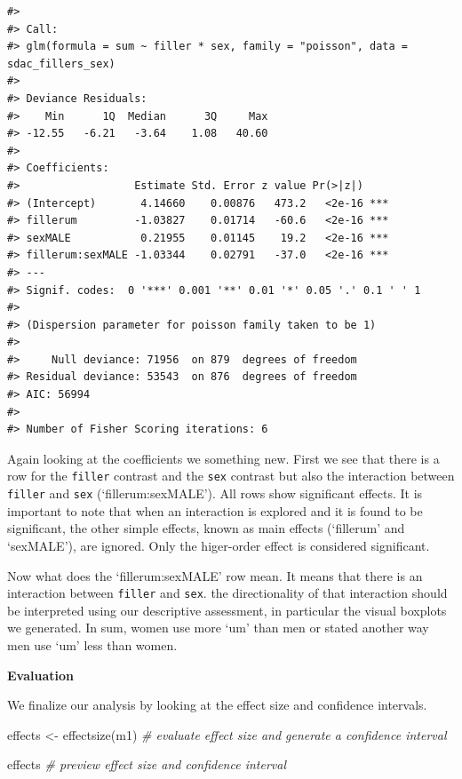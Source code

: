 \documentclass[
  letterpaper,
]{scrbook}
\newenvironment{Shaded}{\begin{snugshade}}{\end{snugshade}}
\newcommand{\CommentTok}[1]{\textcolor[rgb]{0.00,0.00,0.00}{\textit{#1}}}
\newcommand{\FunctionTok}[1]{\textcolor[rgb]{0.00,0.00,0.00}{#1}}
\newcommand{\NormalTok}[1]{\textcolor[rgb]{0.00,0.00,0.00}{#1}}
\newcommand{\OtherTok}[1]{\textcolor[rgb]{0.00,0.00,0.00}{#1}}
\begin{document}
\begin{verbatim}
#> 
#> Call:
#> glm(formula = sum ~ filler * sex, family = "poisson", data = sdac_fillers_sex)
#> 
#> Deviance Residuals: 
#>    Min      1Q  Median      3Q     Max  
#> -12.55   -6.21   -3.64    1.08   40.60  
#> 
#> Coefficients:
#>                  Estimate Std. Error z value Pr(>|z|)    
#> (Intercept)       4.14660    0.00876   473.2   <2e-16 ***
#> fillerum         -1.03827    0.01714   -60.6   <2e-16 ***
#> sexMALE           0.21955    0.01145    19.2   <2e-16 ***
#> fillerum:sexMALE -1.03344    0.02791   -37.0   <2e-16 ***
#> ---
#> Signif. codes:  0 '***' 0.001 '**' 0.01 '*' 0.05 '.' 0.1 ' ' 1
#> 
#> (Dispersion parameter for poisson family taken to be 1)
#> 
#>     Null deviance: 71956  on 879  degrees of freedom
#> Residual deviance: 53543  on 876  degrees of freedom
#> AIC: 56994
#> 
#> Number of Fisher Scoring iterations: 6
\end{verbatim}

Again looking at the coefficients we something new. First we see that
there is a row for the \texttt{filler} contrast and the \texttt{sex}
contrast but also the interaction between \texttt{filler} and
\texttt{sex} (`fillerum:sexMALE'). All rows show significant effects. It
is important to note that when an interaction is explored and it is
found to be significant, the other simple effects, known as main effects
(`fillerum' and `sexMALE'), are ignored. Only the higer-order effect is
considered significant.

Now what does the `fillerum:sexMALE' row mean. It means that there is an
interaction between \texttt{filler} and \texttt{sex}. the directionality
of that interaction should be interpreted using our descriptive
assessment, in particular the visual boxplots we generated. In sum,
women use more `um' than men or stated another way men use `um' less
than women.

\textbf{Evaluation}

We finalize our analysis by looking at the effect size and confidence
intervals.

\begin{Shaded}
\begin{Highlighting}[]
\NormalTok{effects }\OtherTok{\textless{}{-}} \FunctionTok{effectsize}\NormalTok{(m1) }\CommentTok{\# evaluate effect size and generate a confidence interval}

\NormalTok{effects }\CommentTok{\# preview effect size and confidence interval}
\end{Highlighting}
\end{Shaded}
\end{document}
